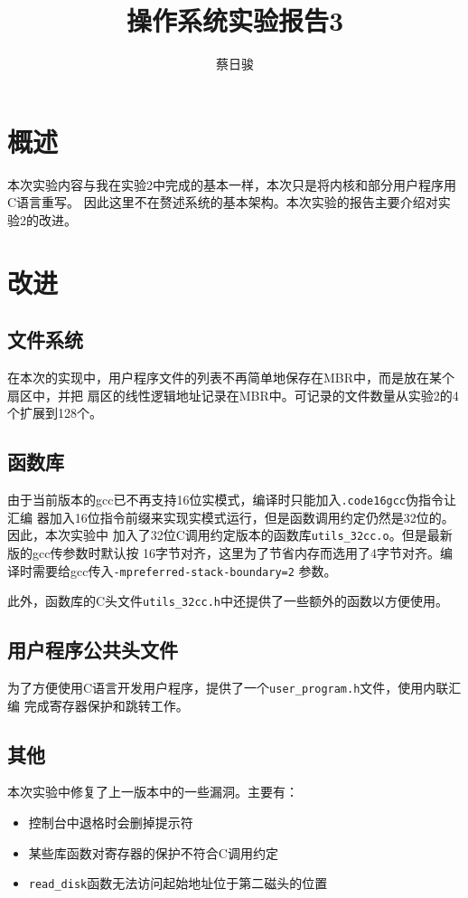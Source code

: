 \documentclass[adobefonts, a4paper]{ctexart}
\title{操作系统实验报告3}
\author{蔡日骏\quad12348003}
\begin{document}
\maketitle

\section{概述}
本次实验内容与我在实验2中完成的基本一样，本次只是将内核和部分用户程序用C语言重写。
因此这里不在赘述系统的基本架构。本次实验的报告主要介绍对实验2的改进。

\section{改进}
\subsection{文件系统}
在本次的实现中，用户程序文件的列表不再简单地保存在MBR中，而是放在某个扇区中，并把
扇区的线性逻辑地址记录在MBR中。可记录的文件数量从实验2的4个扩展到128个。

\subsection{函数库}
由于当前版本的gcc已不再支持16位实模式，编译时只能加入\verb|.code16gcc|伪指令让汇编
器加入16位指令前缀来实现实模式运行，但是函数调用约定仍然是32位的。因此，本次实验中
加入了32位C调用约定版本的函数库\verb|utils_32cc.o|。但是最新版的gcc传参数时默认按
16字节对齐，这里为了节省内存而选用了4字节对齐。编译时需要给gcc传入\verb|-mpreferred-stack-boundary=2|
参数。

此外，函数库的C头文件\verb|utils_32cc.h|中还提供了一些额外的函数以方便使用。

\subsection{用户程序公共头文件}
为了方便使用C语言开发用户程序，提供了一个\verb|user_program.h|文件，使用内联汇编
完成寄存器保护和跳转工作。

\subsection{其他}
本次实验中修复了上一版本中的一些漏洞。主要有：
\begin{itemize}
    \item 控制台中退格时会删掉提示符
    \item 某些库函数对寄存器的保护不符合C调用约定
    \item \verb|read_disk|函数无法访问起始地址位于第二磁头的位置
\end{itemize}
\end{document}

